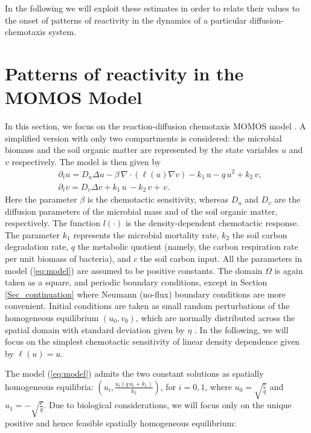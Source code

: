 \documentclass{article}
\begin{document}
 In the following we will exploit these estimates in order to relate their values to the onset of {patterns of reactivity} in the dynamics of a particular diffusion-chemotaxis system.


\section{Patterns of reactivity in the MOMOS Model}\label{Sec_patterns}


In this section, we focus on the reaction-diffusion chemotaxis MOMOS model \cite{hammoudi2018mathematical}.  A simplified version with only two compartments is considered: the microbial biomass and the soil organic matter {are} represented by the state variables $u$ and $v$ respectively. The model is then given by
\begin{equation}\label{eq:model}
\begin{aligned}
&\partial_t u  = D_u \Delta u -\beta \, \nabla \cdot( \ell(u) \nabla v) - k_1 \, u - q \, u^2 + k_2 \,   v, \\
&\partial_t v = D_v \Delta v + k_1 \, u \, -k_2 \, v  + \, c.
\end{aligned}
\end{equation}
Here the parameter $\beta$ is the chemotactic sensitivity, whereas $D_u$ and $D_v$ are the diffusion parameters of the microbial mass and of the soil organic matter, respectively. 
The function $l(\cdot)$ is the density-dependent chemotactic response. The parameter $k_1$ represents the microbial mortality rate, $k_2$ the soil carbon degradation rate, $q$ the metabolic quotient {(namely, the carbon respiration rate per unit biomass of bacteria)}, and $c$ the soil carbon input. All the parameters in  model (\ref{eq:model})  are assumed to be positive constants. The domain $\Omega$ is again taken as a square, and periodic boundary conditions, except in Section \ref{Sec_continuation} where Neumann (no-flux) boundary conditions are more convenient. Initial conditions are taken as small random perturbations of the homogeneous equilibrium $(u_0,v_0)${, which are normally distributed across the spatial domain with standard deviation given by $\eta$} . In the following, we will focus on the {simplest chemotactic sensitivity of linear density dependence given by} $\ell(u)=u$. 

The  model (\ref{eq:model}) admits the two constant solutions as spatially homogeneous equilibria: $\left(u_i, \displaystyle \frac{u_i(q\,u_i+k_1)}{k_2}\right)$, for $i=0,1$, where $u_0=\sqrt{\frac{c}{q}}$ and  $u_1=-\sqrt{\frac{c}{q}}$.
Due to biological considerations,  we will focus only on the unique positive and hence feasible spatially homogeneous equilibrium:  
\end{document}
